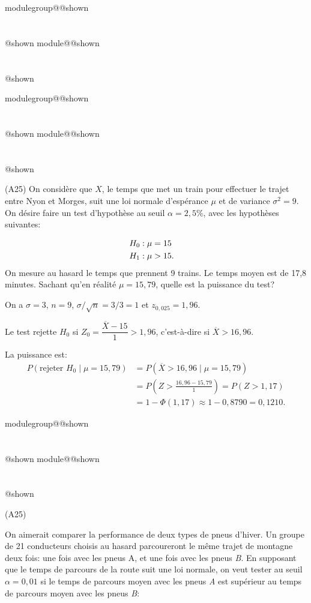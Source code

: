 \documentclass{Evaluation}
\makeatletter
\newcommand{\currentmodulekey}{}
\newcommand{\currentmoduletitle}{}
\newcommand{\currentgroupkey}{}
\newcommand{\currentgrouptitle}{}
\newcommand{\showmoduleifneeded}{%
  \ifx\currentgroupkey\empty\else
    \expandafter\ifx\csname modulegroup@\currentgroupkey @shown\endcsname\relax
      \section*{\currentgrouptitle}%
      \expandafter\gdef\csname modulegroup@\currentgroupkey @shown\endcsname{1}%
    \fi
  \fi
  \expandafter\ifx\csname module@\currentmodulekey @shown\endcsname\relax
    \section*{\currentmoduletitle}%
    \expandafter\gdef\csname module@\currentmodulekey @shown\endcsname{1}%
  \fi
}
\newenvironment{A25}{\showmoduleifneeded}{}
\makeatother
\begin{document}
\begin{questions}
\begin{A25}
\begin{parts}


\end{parts}
\end{A25}


\begin{A25}
\question\label{puissance} (A25)
On considère que $X$, le temps que met un train pour effectuer le trajet entre Nyon et Morges, suit une loi normale d'espérance $\mu$ et de variance $\sigma^2=9$. On désire faire un test d'hypothèse au seuil $\alpha = 2,5\%$, avec les hypothèses suivantes:

\begin{align*}
	H_0&: \mu=15\cr
	H_1&: \mu > 15.
\end{align*}
On mesure au hasard le temps que prennent 9 trains. Le temps moyen est de 17,8 minutes. Sachant qu'en réalité $\mu = 15,79$, quelle est la puissance du test?

\begin{solution}
On a $\sigma = 3$, $n = 9$, $\sigma/\sqrt{n} = 3/3 = 1$ et $z_{0{,}025} = 1{,}96$.

Le test rejette $H_0$ si $Z_0 = \dfrac{\overline{X} - 15}{1} > 1{,}96$, c'est-à-dire si $\overline{X} > 16{,}96$.

La puissance est:
\begin{align*}
P(\text{rejeter } H_0 \mid \mu = 15{,}79) &= P(\overline{X} > 16{,}96 \mid \mu = 15{,}79) \\
&= P\!\left(Z > \frac{16{,}96 - 15{,}79}{1}\right) = P(Z > 1{,}17) \\
&= 1 - \Phi(1{,}17) \approx 1 - 0{,}8790 = 0{,}1210.
\end{align*}
\end{solution}
\end{A25}

\begin{A25}
\question (A25)

On aimerait comparer la performance de deux types de pneus d'hiver. Un groupe de 21 conducteurs choisis au hasard parcoureront le même trajet de montagne deux fois: une fois avec les pneus {A}, et une fois avec les pneus {\it B}. En supposant que le temps de parcours de la route suit une loi normale, on veut tester au seuil $\alpha=0,01$ si le temps de parcours moyen avec les pneus {\it A} est supérieur au temps de parcours moyen avec les pneus {\it B}:




\end{A25}
\end{questions}
\end{document}
